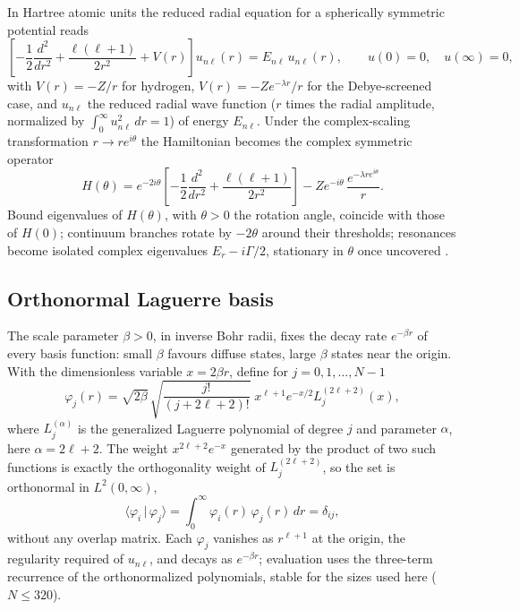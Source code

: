 \documentclass[12pt,twoside]{paper}
\begin{document}
In Hartree atomic units the reduced radial equation for a spherically
symmetric potential reads
\begin{equation}
\left[-\frac{1}{2}\frac{d^2}{dr^2}
      +\frac{\ell(\ell+1)}{2r^2}+V(r)\right]u_{n\ell}(r)
      = E_{n\ell}\,u_{n\ell}(r),
\qquad u(0)=0,\quad u(\infty)=0,
\label{eq:radial}
\end{equation}
with $V(r)=-Z/r$ for hydrogen, $V(r)=-Z e^{-\lambda r}/r$ for the
Debye-screened case, and $u_{n\ell}$ the reduced radial wave function
($r$ times the radial amplitude, normalized by
$\int_0^\infty u_{n\ell}^2\,dr = 1$) of energy $E_{n\ell}$.
Under the complex-scaling transformation
$r \to r e^{i\theta}$ the Hamiltonian becomes the complex symmetric
operator
\begin{equation}
H(\theta) = e^{-2i\theta}\left[-\frac{1}{2}\frac{d^2}{dr^2}
          +\frac{\ell(\ell+1)}{2r^2}\right]
          - Z e^{-i\theta}\,\frac{e^{-\lambda r e^{i\theta}}}{r}.
\label{eq:cs}
\end{equation}
Bound eigenvalues of $H(\theta)$, with $\theta>0$ the rotation angle,
coincide with those of $H(0)$; continuum branches rotate by $-2\theta$
around their thresholds; resonances become isolated complex eigenvalues
$E_r - i\Gamma/2$, stationary in $\theta$ once
uncovered \cite{Moiseyev2011}.

\subsection{Orthonormal Laguerre basis}
\label{sec:basis}

The scale parameter $\beta>0$, in inverse Bohr radii, fixes the decay
rate $e^{-\beta r}$ of every basis function: small $\beta$ favours
diffuse states, large $\beta$ states near the origin. With the dimensionless variable $x = 2\beta r$, define for
$j = 0, 1, \dots, N-1$
\begin{equation}
\varphi_j(r) = \sqrt{2\beta}\,
   \sqrt{\frac{j!}{(j+2\ell+2)!}}\;
   x^{\ell+1} e^{-x/2} L_j^{(2\ell+2)}(x),
\label{eq:basis}
\end{equation}
where $L_j^{(\alpha)}$ is the generalized Laguerre polynomial of degree
$j$ and parameter $\alpha$, here $\alpha = 2\ell+2$. The weight
$x^{2\ell+2}e^{-x}$ generated by the product of two such functions is
exactly the orthogonality weight of $L_j^{(2\ell+2)}$, so the set is
orthonormal in $L^2(0,\infty)$,
\begin{equation}
\langle \varphi_i \,|\, \varphi_j \rangle
 = \int_0^\infty \varphi_i(r)\,\varphi_j(r)\,dr = \delta_{ij},
\label{eq:orthonormal}
\end{equation}
without any overlap matrix. Each $\varphi_j$ vanishes as $r^{\ell+1}$ at
the origin, the regularity required of $u_{n\ell}$, and decays as
$e^{-\beta r}$; evaluation uses the three-term recurrence of the
orthonormalized polynomials, stable for the sizes used here ($N \le 320$).
\end{document}
